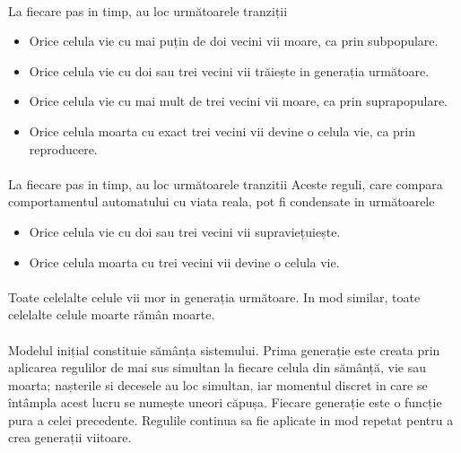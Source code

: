 \documentclass[11pt ,A4]{article}
\begin{document}
        \paragraph{} La fiecare pas in timp, au loc următoarele tranziții
        \begin{itemize}
            \item Orice celula vie cu mai puțin de doi vecini vii moare, ca prin subpopulare.
            \item Orice celula vie cu doi sau trei vecini vii trăiește in generația următoare.
            \item Orice celula vie cu mai mult de trei vecini vii moare, ca prin suprapopulare.
            \item Orice celula moarta cu exact trei vecini vii devine o celula vie, ca prin reproducere.
        \end{itemize}

        \paragraph{} La fiecare pas in timp, au loc următoarele tranzitii Aceste reguli, care compara comportamentul automatului cu viata reala, pot fi condensate in următoarele
        \begin{itemize}
            \item Orice celula vie cu doi sau trei vecini vii supraviețuiește.
            \item Orice celula moarta cu trei vecini vii devine o celula vie.
        \end{itemize}

        \paragraph{} Toate celelalte celule vii mor in generația următoare. In mod similar, toate celelalte celule moarte rămân moarte.

        \paragraph{} Modelul inițial constituie sămânța sistemului. Prima generație este creata prin aplicarea regulilor de mai sus simultan la fiecare celula din sămânță, vie sau moarta; nașterile si decesele au loc simultan, iar momentul discret in care se întâmpla acest lucru se numește uneori căpușa. Fiecare generație este o funcție pura a celei precedente. Regulile continua sa fie aplicate in mod repetat pentru a crea generații viitoare.
\end{document}
